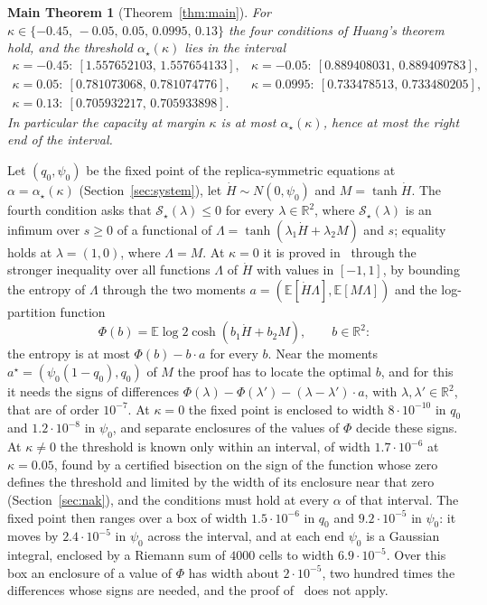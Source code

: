 \documentclass[11pt]{article}
\newtheorem*{mainthm}{Main Theorem}
\theoremstyle{remark}
\newcommand{\E}{\mathbb{E}}
\newcommand{\R}{\mathbb{R}}
\newcommand{\sS}{\mathcal{S}}
\begin{document}
\begin{mainthm}[Theorem~\ref{thm:main}]
For $\kappa\in\{-0.45,\,-0.05,\,0.05,\,0.0995,\,0.13\}$ the four
conditions of Huang's theorem hold, and the threshold
$\alpha_\star(\kappa)$ lies in the interval
\[
\begin{array}{ll}
\kappa=-0.45:\ [1.557652103,\,1.557654133], &
\kappa=-0.05:\ [0.889408031,\,0.889409783],\\
\kappa=0.05:\ [0.781073068,\,0.781074776], &
\kappa=0.0995:\ [0.733478513,\,0.733480205],\\
\kappa=0.13:\ [0.705932217,\,0.705933898]. &
\end{array}
\]
In particular the capacity at margin $\kappa$ is at most
$\alpha_\star(\kappa)$, hence at most the right end of the interval.
\end{mainthm}

Let $(q_0,\psi_0)$ be the fixed point of the replica-symmetric equations at
$\alpha=\alpha_\star(\kappa)$ (Section~\ref{sec:system}), let $\dot H\sim N(0,\psi_0)$ and
$M=\tanh\dot H$.  The fourth condition asks that $\sS_\star(\lambda)\le0$ for every $\lambda\in\R^2$,
where $\sS_\star(\lambda)$ is an infimum over $s\ge0$ of a functional of
$\Lambda=\tanh(\lambda_1\dot H+\lambda_2M)$ and $s$; equality holds at $\lambda=(1,0)$, where $\Lambda=M$.  At $\kappa=0$ it is proved in~\cite{shmalo2026capacity}
through the stronger inequality over all functions $\Lambda$ of $\dot H$ with values in $[-1,1]$,
by bounding the entropy of $\Lambda$ through the two moments
$a=(\E[\dot H\Lambda],\E[M\Lambda])$ and the log-partition function
\[
\Phi(b)=\E\log2\cosh(b_1\dot H+b_2M),\qquad b\in\R^2 :
\]
the entropy is at most $\Phi(b)-b\cdot a$ for every $b$.  Near the moments
$a^\star=(\psi_0(1-q_0),q_0)$ of $M$ the proof has to locate the optimal $b$, and for this it
needs the signs of differences $\Phi(\lambda)-\Phi(\lambda')-(\lambda-\lambda')\cdot a$, with
$\lambda,\lambda'\in\R^2$, that are of order $10^{-7}$.  At $\kappa=0$ the fixed point is
enclosed to width $8\cdot10^{-10}$ in $q_0$ and $1.2\cdot10^{-8}$ in $\psi_0$, and separate
enclosures of the values of $\Phi$ decide these signs.  At $\kappa\ne0$ the threshold is known
only within an interval, of width $1.7\cdot10^{-6}$ at $\kappa=0.05$, found by a certified
bisection on the sign of the function whose zero defines the threshold and limited by the width
of its enclosure near that zero (Section~\ref{sec:nak}), and the conditions must
hold at every $\alpha$ of that interval.  The fixed point then ranges over a box of width
$1.5\cdot10^{-6}$ in $q_0$ and $9.2\cdot10^{-5}$ in $\psi_0$: it moves by $2.4\cdot10^{-5}$ in
$\psi_0$ across the interval, and at each end $\psi_0$ is a Gaussian integral, enclosed by a
Riemann sum of $4000$ cells to width $6.9\cdot10^{-5}$.  Over this box an enclosure of a value of $\Phi$ has width about
$2\cdot10^{-5}$, two hundred times the differences whose signs are needed, and the proof
of~\cite{shmalo2026capacity} does not apply.
\end{document}
